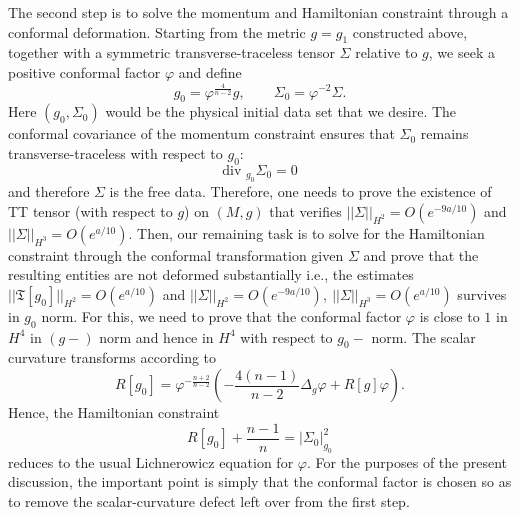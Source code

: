 \documentclass{amsart}
\renewcommand{\div}{\mbox{div }}
\begin{document}
\noindent The second step is to solve the momentum and Hamiltonian constraint through a conformal deformation. Starting from the metric $g=g_{1}$ constructed above, together with a symmetric transverse-traceless tensor $\Sigma$ relative to $g$, we seek a positive conformal factor $\varphi$ and define
\[
g_{0}=\varphi^{\frac{4}{n-2}}g,
\qquad
\Sigma_{0}=\varphi^{-2}\Sigma.
\]
Here $(g_{0},\Sigma_{0})$ would be the physical initial data set that we desire.
The conformal covariance of the momentum constraint ensures that $\Sigma_{0}$ remains transverse-traceless with respect to $g_{0}$:
\[
\div_{g_{0}}\Sigma_{0}=0
\]
and therefore $\Sigma$ is the free data. Therefore, one needs to prove the existence of TT tensor (with respect to $g$) on $(M,g)$ that verifies $||\Sigma||_{H^{2}}=O(e^{-9a/10})$ and $||\Sigma||_{H^{3}}=O(e^{a/10})$. Then, our remaining task is to solve for the Hamiltonian constraint through the conformal transformation given $\Sigma$ and prove that the resulting entities are not deformed substantially i.e., the estimates $||\mathfrak{T}[g_{0}]||_{H^{2}}=O(e^{a/10})$ and $||\Sigma||_{H^{2}}=O(e^{-9a/10}),~||\Sigma||_{H^{3}}=O(e^{a/10})$ survives in $g_{0}$ norm. For this, we need to prove that the conformal factor $\varphi$ is close to $1$ in $H^{4}$ in $(g-)$ norm and hence in $H^{4}$ with respect to $g_{0}-$ norm. 
The scalar curvature transforms according to
\begin{equation}\label{eq:scal_intro}
R[g_{0}]
=
\varphi^{-\frac{n+2}{n-2}}
\left(
-\frac{4(n-1)}{n-2}\Delta_{g}\varphi
+
R[g]\varphi
\right).
\end{equation}
Hence, the Hamiltonian constraint
\[
R[g_{0}]+\frac{n-1}{n}=|\Sigma_{0}|_{g_{0}}^{2}
\]
reduces to the usual Lichnerowicz equation for $\varphi$. For the purposes of the present discussion, the important point is simply that the conformal factor is chosen so as to remove the scalar-curvature defect left over from the first step.
\end{document}
